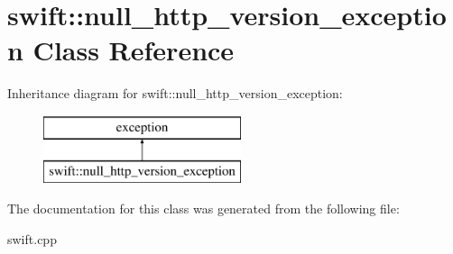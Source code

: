 \hypertarget{classswift_1_1null__http__version__exception}{\section{swift\-:\-:null\-\_\-http\-\_\-version\-\_\-exception Class Reference}
\label{classswift_1_1null__http__version__exception}
}
Inheritance diagram for swift\-:\-:null\-\_\-http\-\_\-version\-\_\-exception\-:\begin{figure}[H]
\begin{center}
\leavevmode
\includegraphics[height=2.000000cm]{classswift_1_1null__http__version__exception}
\end{center}
\end{figure}


The documentation for this class was generated from the following file\-:\begin{DoxyCompactItemize}
\item 
swift.\-cpp\end{DoxyCompactItemize}

